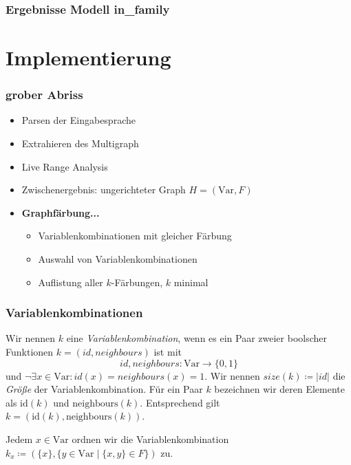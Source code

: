 \documentclass[onlymath]{beamer}
\begin{document}
\begin{frame}
	\frametitle{Ergebnisse Modell in\_family}
	\centering
\end{frame}

\section{Implementierung}

\begin{frame}
	\frametitle{grober Abriss}
	\begin{itemize}
		\item Parsen der Eingabesprache\pause
		\item Extrahieren des Multigraph\pause
		\item Live Range Analysis\pause
		\item Zwischenergebnis: ungerichteter Graph $H=(\mathrm{Var}, F)$\pause
		\item \textbf{Graphfärbung...}\pause \begin{itemize}
			\item Variablenkombinationen mit gleicher Färbung\pause
			\item Auswahl von Variablenkombinationen\pause
			\item Auflistung aller $k$-Färbungen, $k$ minimal
		\end{itemize}
	\end{itemize}	
\end{frame}

\begin{frame}
	\frametitle{Variablenkombinationen}
\begin{definition}[Variablenkombination]
	Wir nennen $k$ eine \emph{Variablenkombination}, wenn es ein Paar zweier boolscher Funktionen $k = (id, neighbours)$ ist mit
	\[id, neighbours : \mbox{Var} \to \{0,1\}
	\] \pause
	und $\neg \exists x \in \mathrm{Var} : id(x) = neighbours(x) = 1$. Wir nennen $size(k) \coloneqq |id|$ die \emph{Größe} der Variablenkombination. \pause
	Für ein Paar $k$ bezeichnen wir deren Elemente als $\mathrm{id}(k)$ und $\mathrm{neighbours}(k)$. Entsprechend gilt $k = (\mathrm{id}(k),\mathrm{neighbours}(k))$.
\end{definition} \pause

Jedem $x \in \mathrm{Var}$ ordnen wir die Variablenkombination $k_x \coloneqq (\{x\}, \{y \in \mathrm{Var} \mid \{x,y\} \in F\})$ zu.
\end{frame}
\end{document}

